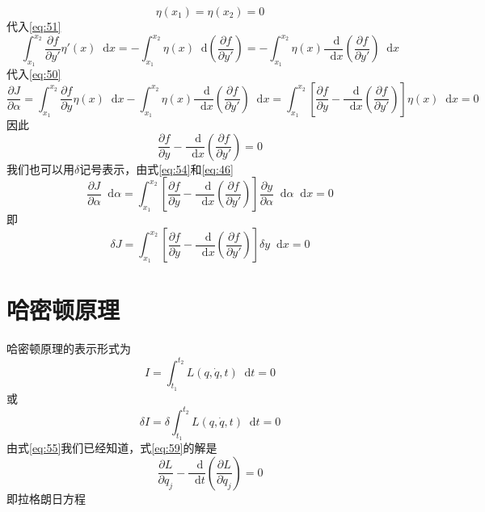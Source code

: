 \documentclass{article}
\newcommand*{\dif}{\mathop{}\!\mathrm{d}}
\begin{document}
 \begin{equation}
   \label{eq:52}
    \eta (x_{1}) = \eta (x_{2}) = 0
  \end{equation}
代入\ref{eq:51}
 \begin{equation}
   \label{eq:53}
   \int_{x_{1}}^{x_{2}} \frac{\partial f}{\partial y'} \eta'(x) \dif x = - \int_{x_{1}}^{x_{2}} \eta (x) \dif \left( \frac{\partial f}{\partial y'} \right) = - \int_{x_{1}}^{x_{2}} \eta (x) \frac{\dif}{\dif x} \left( \frac{\partial f}{\partial y'} \right) \dif x
 \end{equation}
 代入\ref{eq:50}
 \begin{equation}
   \label{eq:54}
   \frac{\partial J}{\partial \alpha} = \int_{x_{1}}^{x_{2}} \frac{\partial f}{\partial y} \eta (x) \dif x - \int_{x_{1}}^{x_{2}} \eta (x) \frac{\dif}{\dif x} \left( \frac{\partial f}{\partial y'} \right) \dif x = \int_{x_{1}}^{x_{2}} \left[ \frac{\partial f}{\partial y} -  \frac{\dif}{\dif x} \left( \frac{\partial f}{\partial y'} \right) \right]\eta (x) \dif x = 0
\end{equation}
 因此
\begin{equation}
   \label{eq:55}
   \frac{\partial f}{\partial y} -  \frac{\dif}{\dif x} \left( \frac{\partial f}{\partial y'} \right) = 0
 \end{equation}
 我们也可以用$\delta$记号表示，由式\ref{eq:54}和\ref{eq:46}
 \begin{equation}
   \label{eq:56}
    \frac{\partial J}{\partial \alpha} \dif \alpha = \int_{x_{1}}^{x_{2}} \left[ \frac{\partial f}{\partial y} -  \frac{\dif}{\dif x} \left( \frac{\partial f}{\partial y'} \right) \right] \frac{\partial y}{\partial \alpha} \dif \alpha \dif x = 0
  \end{equation}
  即
  \begin{equation}
    \label{eq:57}
    \delta J = \int_{x_{1}}^{x_{2}} \left[ \frac{\partial f}{\partial y} -  \frac{\dif}{\dif x} \left( \frac{\partial f}{\partial y'} \right) \right] \delta  y \dif x = 0
  \end{equation}

  \section{哈密顿原理}

  哈密顿原理的表示形式为
  \begin{equation}
    \label{eq:58}
    I = \int_{t_{1}}^{t_{2}} L \left( q,\dot{q},t \right) \dif t= 0
  \end{equation}
  或
  \begin{equation}
    \label{eq:59}
    \delta I = \delta \int_{t_{1}}^{t_{2}} L \left( q,\dot{q},t \right) \dif t= 0
  \end{equation}
  由式\ref{eq:55}我们已经知道，式\ref{eq:59}的解是
  \begin{equation}
    \label{eq:60}
    \frac{\partial L}{\partial q_{j}} -  \frac{\dif}{\dif t} \left( \frac{\partial L}{\partial \dot{q}_{j}} \right) = 0
  \end{equation}
  即拉格朗日方程
\end{document}
